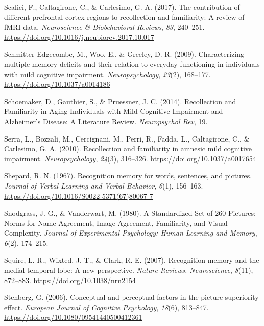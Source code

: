 \documentclass[
  11pt,
]{article}
\begin{document}
\leavevmode\hypertarget{ref-scalici2017}{}%
Scalici, F., Caltagirone, C., \& Carlesimo, G. A. (2017). The
contribution of different prefrontal cortex regions to recollection and
familiarity: A review of fMRI data. \emph{Neuroscience \& Biobehavioral
Reviews}, \emph{83}, 240--251.
\url{https://doi.org/10.1016/j.neubiorev.2017.10.017}

\leavevmode\hypertarget{ref-schmitter-edgecombe2009}{}%
Schmitter-Edgecombe, M., Woo, E., \& Greeley, D. R. (2009).
Characterizing multiple memory deficits and their relation to everyday
functioning in individuals with mild cognitive impairment.
\emph{Neuropsychology}, \emph{23}(2), 168--177.
\url{https://doi.org/10.1037/a0014186}

\leavevmode\hypertarget{ref-schoemaker2014}{}%
Schoemaker, D., Gauthier, S., \& Pruessner, J. C. (2014). Recollection
and Familiarity in Aging Individuals with Mild Cognitive Impairment and
Alzheimer's Disease: A Literature Review. \emph{Neuropsychol Rev}, 19.

\leavevmode\hypertarget{ref-serra2010}{}%
Serra, L., Bozzali, M., Cercignani, M., Perri, R., Fadda, L.,
Caltagirone, C., \& Carlesimo, G. A. (2010). Recollection and
familiarity in amnesic mild cognitive impairment.
\emph{Neuropsychology}, \emph{24}(3), 316--326.
\url{https://doi.org/10.1037/a0017654}

\leavevmode\hypertarget{ref-shepard1967}{}%
Shepard, R. N. (1967). Recognition memory for words, sentences, and
pictures. \emph{Journal of Verbal Learning and Verbal Behavior},
\emph{6}(1), 156--163.
\url{https://doi.org/10.1016/S0022-5371(67)80067-7}

\leavevmode\hypertarget{ref-snodgrass1980}{}%
Snodgrass, J. G., \& Vanderwart, M. (1980). A Standardized Set of 260
Pictures: Norms for Name Agreement, Image Agreement, Familiarity, and
Visual Complexity. \emph{Journal of Experimental Psychology: Human
Learning and Memory}, \emph{6}(2), 174--215.

\leavevmode\hypertarget{ref-squire2007}{}%
Squire, L. R., Wixted, J. T., \& Clark, R. E. (2007). Recognition memory
and the medial temporal lobe: A new perspective. \emph{Nature Reviews.
Neuroscience}, \emph{8}(11), 872--883.
\url{https://doi.org/10.1038/nrn2154}

\leavevmode\hypertarget{ref-stenberg2006}{}%
Stenberg, G. (2006). Conceptual and perceptual factors in the picture
superiority effect. \emph{European Journal of Cognitive Psychology},
\emph{18}(6), 813--847. \url{https://doi.org/10.1080/09541440500412361}
\end{document}
